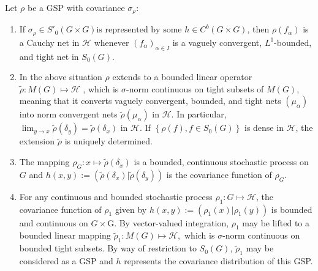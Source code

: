 \documentclass[10pt,a4paper]{amsart}
\begin{document}
\begin{theorem}\label{ch18:the10}
Let $\rho $ be a GSP with covariance ${\sigma_{ \rho}}$:
\begin{enumerate}
\item[(a)] If $\sigma _{\rho} \in  S'_{0}(G\times G)
\text{is represented by some }
h \in  C^{b}(G\times G)$, then
 $\rho (f_{\alpha })$ is a Cauchy net in $\mathcal{H}$ whenever
$(f_{\alpha })_{\alpha \in I}$ is a vaguely convergent, $L^{1}$-bounded, and tight net in ${S_{0}(G)}$.

\item[(b)] In the above situation $\rho $ extends to
 a bounded linear operator
$\tilde{\rho}: M(G) \mapsto \mathcal{H}$ , which is $\sigma $-norm
continuous on tight subsets of $M(G)$, meaning that it converts
vaguely convergent, bounded, and  tight nets $(\mu_\alpha)$
into norm convergent nets $\tilde{\rho}(\mu_\alpha)$ in $\mathcal{H}$.
In particular,
$\lim_{y\rightarrow x} \tilde{\rho}(\delta _{y}) = \tilde{\rho}(\delta
_{x})$ in $\mathcal{H}$.  If $\left\{ \rho (f), f \in {S_{0}(G)} \right\} $ is dense in $\mathcal{H}$,
the extension $\tilde{\rho}$ is uniquely determined.

\item[(c)] The mapping $\rho_G \colon x \mapsto \tilde{\rho}(\delta_x)$ is a bounded, continuous stochastic process on $G$ and
$h(x,y) := (\tilde{\rho}(\delta_x) | \tilde{\rho}(\delta_y))$
is the covariance function of $\rho_G$.

\item[(d)] For any continuous and bounded stochastic process
 $\rho_{1}:G \mapsto  \mathcal{H}$,
the covariance function of $\rho _{1}  $ given by
$h(x,y) := (\rho_{1}(x)| \rho _{1}(y))$
is bounded and continuous on $G\times $G.  By vector-valued
integration, $\rho _{1}$ may be lifted to a bounded linear mapping
$\tilde{\rho}_{1}: M(G) \mapsto  \mathcal{H},$ which is $\sigma$-norm
continuous on bounded tight subsets. By
way of restriction to ${S_{0}(G)}$, $\tilde{\rho}_{1}$ may be considered
as a GSP  and $h$
represents the covariance distribution of this GSP.
\end{enumerate}
\end{theorem}
\end{document}
